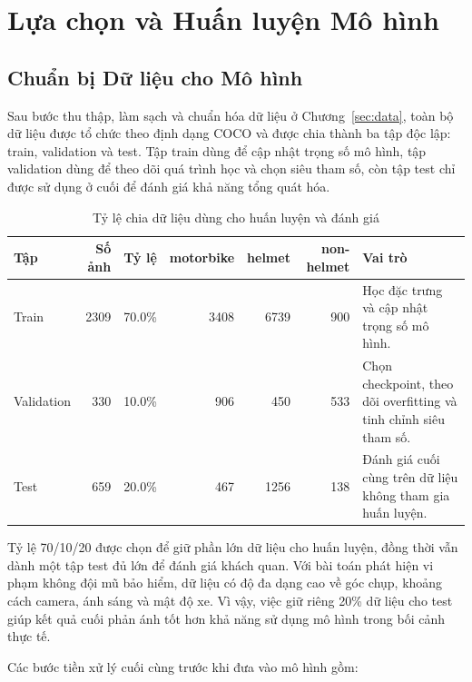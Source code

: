 \section{Lựa chọn và Huấn luyện Mô hình}
\label{sec:models}

\subsection{Chuẩn bị Dữ liệu cho Mô hình}

Sau bước thu thập, làm sạch và chuẩn hóa dữ liệu ở Chương~\ref{sec:data}, toàn bộ dữ liệu được tổ chức theo định dạng COCO và được chia thành ba tập độc lập: train, validation và test. Tập train dùng để cập nhật trọng số mô hình, tập validation dùng để theo dõi quá trình học và chọn siêu tham số, còn tập test chỉ được sử dụng ở cuối để đánh giá khả năng tổng quát hóa.

\begin{table}[H]
    \centering
    \scriptsize
    \caption{Tỷ lệ chia dữ liệu dùng cho huấn luyện và đánh giá}
    \label{tab:train-val-test-split}
    \begin{tabularx}{\textwidth}{lrrrrrX}
        \toprule
        \textbf{Tập} & \textbf{Số ảnh} & \textbf{Tỷ lệ} & \textbf{motorbike} & \textbf{helmet} & \textbf{non-helmet} & \textbf{Vai trò} \\
        \midrule
        Train & 2309 & 70.0\% & 3408 & 6739 & 900 & Học đặc trưng và cập nhật trọng số mô hình. \\
        Validation & 330 & 10.0\% & 906 & 450 & 533 & Chọn checkpoint, theo dõi overfitting và tinh chỉnh siêu tham số. \\
        Test & 659 & 20.0\% & 467 & 1256 & 138 & Đánh giá cuối cùng trên dữ liệu không tham gia huấn luyện. \\
        \bottomrule
    \end{tabularx}
\end{table}

Tỷ lệ 70/10/20 được chọn để giữ phần lớn dữ liệu cho huấn luyện, đồng thời vẫn dành một tập test đủ lớn để đánh giá khách quan. Với bài toán phát hiện vi phạm không đội mũ bảo hiểm, dữ liệu có độ đa dạng cao về góc chụp, khoảng cách camera, ánh sáng và mật độ xe. Vì vậy, việc giữ riêng 20\% dữ liệu cho test giúp kết quả cuối phản ánh tốt hơn khả năng sử dụng mô hình trong bối cảnh thực tế.

Các bước tiền xử lý cuối cùng trước khi đưa vào mô hình gồm:

